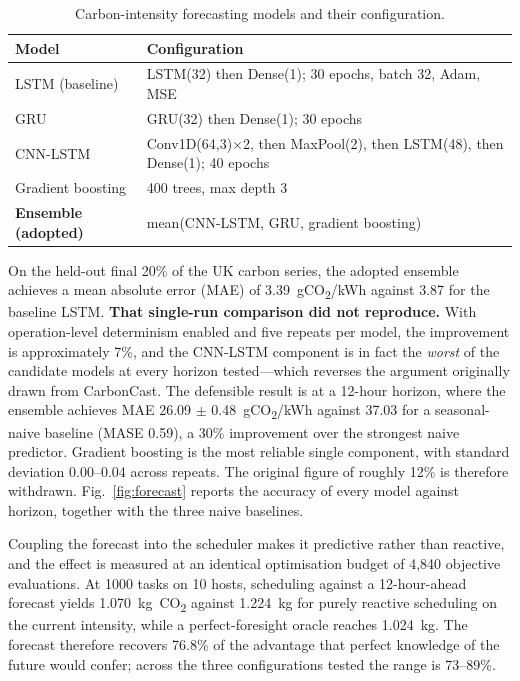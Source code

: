 \documentclass[12pt,a4paper]{article}
\begin{document}
\begin{table}[H]\centering \footnotesize
\caption{Carbon-intensity forecasting models and their configuration.}\label{tab:forecast}
\begin{tabular}{@{}lp{5.0cm}@{}}
\toprule Model & Configuration \\ \midrule
LSTM (baseline) & LSTM(32) then Dense(1); 30 epochs, batch 32, Adam, MSE \\
GRU & GRU(32) then Dense(1); 30 epochs \\
CNN-LSTM & Conv1D(64,3)$\times$2, then MaxPool(2), then LSTM(48), then Dense(1); 40 epochs \\
Gradient boosting & 400 trees, max depth 3 \\
\textbf{Ensemble (adopted)} & mean(CNN-LSTM, GRU, gradient boosting) \\
\bottomrule
\end{tabular}
\end{table}

On the held-out final 20\% of the UK carbon series, the adopted ensemble achieves a mean absolute error (MAE)
of 3.39~gCO\textsubscript{2}/kWh against 3.87 for the baseline LSTM. \textbf{That single-run comparison did
not reproduce.} With operation-level determinism enabled and five repeats per model, the improvement is
approximately 7\%, and the CNN-LSTM component is in fact the \emph{worst} of the candidate models at every
horizon tested---which reverses the argument originally drawn from CarbonCast. The defensible result is at a
12-hour horizon, where the ensemble achieves MAE 26.09 $\pm$ 0.48~gCO\textsubscript{2}/kWh against 37.03 for a
seasonal-naive baseline (MASE 0.59), a 30\% improvement over the strongest naive predictor. Gradient boosting
is the most reliable single component, with standard deviation 0.00--0.04 across repeats. The original figure
of roughly 12\% is therefore withdrawn. Fig.~\ref{fig:forecast} reports the accuracy of every model against
horizon, together with the three naive baselines.

Coupling the forecast into the scheduler makes it predictive rather than reactive, and the effect is measured
at an identical optimisation budget of 4{,}840 objective evaluations. At 1000 tasks on 10 hosts, scheduling
against a 12-hour-ahead forecast yields 1.070~kg~CO\textsubscript{2} against 1.224~kg for purely reactive
scheduling on the current intensity, while a perfect-foresight oracle reaches 1.024~kg. The forecast therefore
recovers 76.8\% of the advantage that perfect knowledge of the future would confer; across the three
configurations tested the range is 73--89\%.
\end{document}
